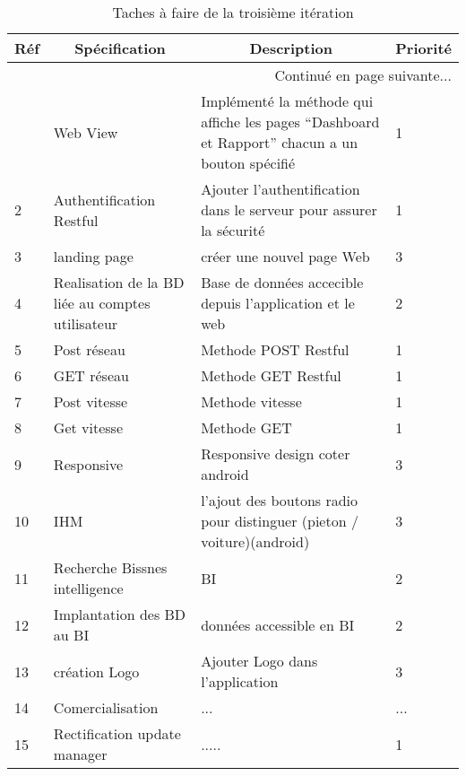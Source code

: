 \begin{center}
    \footnotesize
    \begin{longtable}{| p{1cm} | p{5cm} | p{7cm} | p{1cm} |}
        \caption{Taches à faire de la troisième itération}
        \label{tab:sprint3-backlog} \\

 \hline
 \multicolumn{1}{|c}{\textbf{Réf}} &
 \multicolumn{1}{|c}{\textbf{Spécification}} &
 \multicolumn{1}{|c}{\textbf{Description}} &
 \multicolumn{1}{|c|}{\textbf{Priorité}} \\ \hline
 \endhead

 \hline \multicolumn{4}{|r|}{{Continué en page suivante$\dotsc$}} \\ \hline
 \endfoot

 \hline \hline
 \endlastfoot

\hline
1 & Web View & Implémenté la méthode qui affiche les pages ``Dashboard et Rapport'' chacun a un bouton spécifié   & 1 \\ \hline
2 & Authentification Restful  & Ajouter l'authentification dans le serveur pour assurer la sécurité   & 1 \\ \hline
3 & landing page & créer une nouvel page Web  & 3\\ \hline
4 & Realisation de la BD liée au comptes utilisateur& Base de données accecible depuis l'application et le web& 2 \\ \hline
5 & Post réseau & Methode POST Restful & 1 \\ \hline
6 & GET réseau & Methode GET Restful & 1 \\ \hline
7 & Post vitesse & Methode vitesse & 1 \\ \hline
8 & Get vitesse & Methode GET & 1 \\ \hline
9 & Responsive & Responsive design coter android & 3 \\ \hline
10 & IHM & l'ajout des boutons radio pour distinguer (pieton / voiture)(android) & 3 \\ \hline
11 & Recherche Bissnes intelligence & BI & 2 \\ \hline
12 & Implantation des BD au BI & données accessible en BI & 2\\ \hline
13 & création Logo &Ajouter Logo dans l'application & 3 \\ \hline
14 & Comercialisation & ...& ...\\ \hline
15 & Rectification update manager &..... & 1 \\ \hline



\end{longtable}
\end{center}

